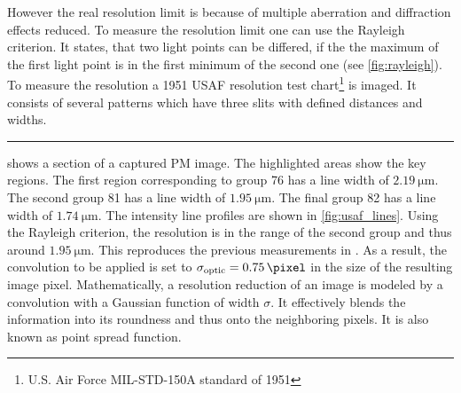% 
However the real resolution limit is because of multiple aberration and diffraction effects reduced.
To measure the resolution limit one can use the Rayleigh criterion.
It states, that two light points can be differed, if the the maximum of the first light point is in the first minimum of the second one (see \cref{fig:rayleigh}).
% 
To measure the resolution a \textrm{1951 \ac{USAF} resolution test chart}\footnote{U.S. Air Force MIL-STD-150A standard of 1951} is imaged.
It consists of several patterns which have three slits with defined distances and widths.
% 
\par
\noindent\rule{\textwidth}{2pt}
% 
\newpage
% 
% 
 shows a section of a captured PM image.
The highlighted areas show the key regions.
The first region corresponding to group \textrm{7\text{-}6}  has a line width of $\SI{2.19}{\micro\meter}$.
The second group \textrm{8\text{-}1}  has a line width of $\SI{1.95}{\micro\meter}$.
The final group \textrm{8\text{-}2}  has a line width of $\SI{1.74}{\micro\meter}$.
The intensity line profiles are shown in \cref{fig:usaf_lines}.
% 
Using the Rayleigh criterion, the resolution is in the range of the second group and thus around $\SI{1.95}{\micro\meter}$.
This reproduces the previous measurements in \cite{MenzelMaster} .
As a result, the convolution to be applied is set to $\opticsigma = \SI{0.75}{\pixel}$ in the size of the resulting image pixel.
% 
Mathematically, a resolution reduction of an image is modeled by a convolution with a Gaussian function of width $\sigma$.
It effectively blends the information into its roundness and thus onto the neighboring pixels.
It is also known as point spread function.
% 
% 

